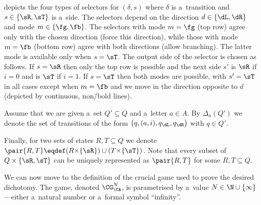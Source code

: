  depicts the four types of selectors for $(\delta, s)$ where $\delta$ is a~transition and $s\in\{\sR,\sT\}$ is a~side. The selectors depend on the direction $d\in\{\dL,\dR\}$ and mode $m\in\{\fg,\fb\}$. The selectors with mode $m=\fg$ (top row) agree only with the chosen direction (force this direction), while those with mode $m=\fb$ (bottom row) agree with both directions (allow branching). The latter mode is available only when $s=\sT$. The output side of the selector is chosen as follows. If $s=\sR$ then only the top row is possible and the next side $s'$ is $\sR$ if $i=0$ and is $\sT$ if $i=1$. If $s=\sT$ then both modes are possible, with $s'=\sT$ in all cases except when $m=\fb$ and we move in the direction opposite to $d$ (depicted by continuous, non\=/bold lines).

Assume that we are given a~set $Q'\subseteq Q$ and a~letter $a\in A$.
By $\Delta_a(Q')$ we denote the set of transitions of the form $\big(q, (a,i), q_\dL,q_\dR\big)$ with $q\in Q'$.

Finally, for two sets of states $R,T\subseteq Q$ we denote $\pair{R,T}\eqdef(R{\times}\{\sR\})\cup(T{\times}\{\sT\})$.
Note that every subset of $Q\times\{\sR,\sT\}$ can be uniquely represented as $\pair{R,T}$ for some $R,T\subseteq Q$.

We can now move to the definition of the crucial game used to prove the desired dichotomy.
The game, denoted $\CG^N_\CA$, is parametrised by a~value $N\in\N\cup\{\infty\}$---either a~natural number or a~formal symbol ``infinity''.

